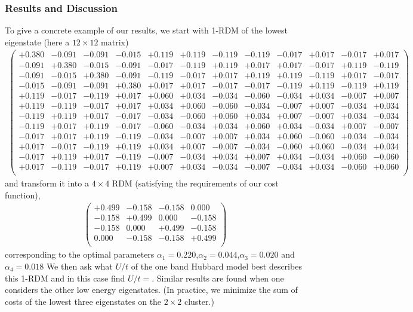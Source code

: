 \documentclass[prl,12pt,onecolumn,nofootinbib,notitlepage,english,superscriptaddress]{revtex4-1}
\begin{document}
\subsubsection{Results and Discussion}
To give a concrete example of our results, we start with 1-RDM of the lowest eigenstate (here a $12 \times 12$ 
matrix) 
\begin{eqnarray}
\left(
\begin{array}{cccccccccccc}
+0.380	   & -0.091 &-0.091 &-0.015& +0.119& +0.119& -0.119 &-0.119 &-0.017 &+0.017 &-0.017 &+0.017 \\
-0.091	   & +0.380 &-0.015 &-0.091& -0.017& -0.119& +0.119 &+0.017 &+0.017 &-0.017 &+0.119 &-0.119 \\
-0.091	   & -0.015 &+0.380 &-0.091& -0.119& -0.017& +0.017 &+0.119 &+0.119 &-0.119 &+0.017 &-0.017 \\
-0.015	   & -0.091 &-0.091 &+0.380& +0.017& +0.017& -0.017 &-0.017 &-0.119 &+0.119 &-0.119 &+0.119 \\
+0.119	   & -0.017 &-0.119 &+0.017& +0.060& +0.034& -0.034 &-0.060 &-0.034 &+0.034 &-0.007 &+0.007 \\
+0.119	   & -0.119 &-0.017 &+0.017& +0.034& +0.060& -0.060 &-0.034 &-0.007 &+0.007 &-0.034 &+0.034 \\
-0.119	   & +0.119 &+0.017 &-0.017& -0.034& -0.060& +0.060 &+0.034 &+0.007 &-0.007 &+0.034 &-0.034 \\
-0.119	   & +0.017 &+0.119 &-0.017& -0.060& -0.034& +0.034 &+0.060 &+0.034 &-0.034 &+0.007 &-0.007 \\
-0.017	   & +0.017 &+0.119 &-0.119& -0.034& -0.007& +0.007 &+0.034 &+0.060 &-0.060 &+0.034 &-0.034 \\
+0.017	   & -0.017 &-0.119 &+0.119& +0.034& +0.007& -0.007 &-0.034 &-0.060 &+0.060 &-0.034 &+0.034 \\
-0.017	   & +0.119 &+0.017 &-0.119& -0.007& -0.034& +0.034 &+0.007 &+0.034 &-0.034 &+0.060 &-0.060 \\
+0.017	   & -0.119 &-0.017 &+0.119& +0.007& +0.034& -0.034 &-0.007 &-0.034 &+0.034 &-0.060 &+0.060 \\
\end{array}
\right)
\end{eqnarray}
and transform it into a $4\times4$ RDM (satisfying the requirements of our cost function), 
\begin{eqnarray}
\left(
\begin{array}{cccc}
+0.499 & -0.158 & -0.158 & 0.000  \\
-0.158 & +0.499 &  0.000 & -0.158 \\
-0.158 &  0.000 & +0.499 & -0.158 \\
 0.000 & -0.158 & -0.158 & +0.499 \\
\end{array}
\right)
\end{eqnarray}
corresponding to the optimal parameters $\alpha_1=0.220$,$\alpha_2=0.044$,$\alpha_3=0.020$ and $\alpha_4=0.018$ 
We then ask what $U/t$ of the one band Hubbard model best describes this 1-RDM and in this case find $U/t = $. 
Similar results are found when one considers the other low energy eigenstates. 
(In practice, we minimize the sum of costs of the lowest three eigenstates on the $2 \times 2$ cluster.) 
 
\end{document}
